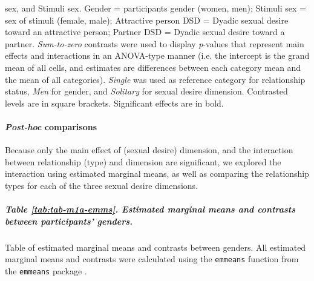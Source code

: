 \documentclass[
  bookmarksnumbered]{article}
\begin{document}
\begin{table}[H]
{\begin{threeparttable}
\begin{tablenotes}[para]
                              sex, and Stimuli sex.
                              Gender = participants gender (women, men); 
                              Stimuli sex = sex of stimuli (female, male);
                              Attractive person DSD = Dyadic sexual desire toward an 
                              attractive person;
                              Partner DSD = Dyadic sexual desire toward a partner.
                              \textit{Sum-to-zero} contrasts were used to display
                              \textit{p}-values that represent main effects and interactions 
                              in an ANOVA-type manner (i.e. the intercept is the grand mean of 
                              all cells, and estimates are differences between each category
                              mean and the mean of all categories).
                              \textit{Single} was used as reference category
                              for relationship status, \textit{Men} for gender, 
                              and \textit{Solitary} for  sexual desire dimension.
                              Contrasted levels are in square brackets.
                              Significant effects are in bold.
\end{tablenotes}
\end{threeparttable}}
\end{table}

\hypertarget{post-hoc-comparisons}{%
\paragraph{\texorpdfstring{\emph{Post-hoc} comparisons}{Post-hoc comparisons}}\label{post-hoc-comparisons}}

Because only the main effect of (sexual desire) dimension, and the interaction between relationship (type) and dimension are significant, we explored the interaction using estimated marginal means, as well as comparing the relationship types for each of the three sexual desire dimensions.

\hypertarget{table-reftabtab-m1a-emms.-estimated-marginal-means-and-contrasts-between-participants-genders.}{%
\subparagraph{Table \ref{tab:tab-m1a-emms}. Estimated marginal means and contrasts between participants' genders.}\label{table-reftabtab-m1a-emms.-estimated-marginal-means-and-contrasts-between-participants-genders.}}

Table of estimated marginal means and contrasts between genders. All estimated marginal means and contrasts were calculated using the \texttt{emmeans} function from the \texttt{emmeans} package \autocite{emmeanscit}.
\end{document}
